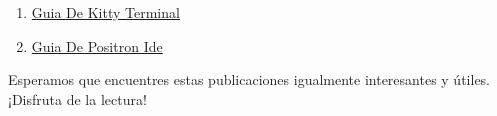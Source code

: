 \documentclass[
  jou,
  floatsintext,
  longtable,
  a4paper,
  nolmodern,
  notxfonts,
  notimes,
  12pt,
  colorlinks=true,linkcolor=blue,citecolor=blue,urlcolor=blue]{apa7}
\begin{document}
\begin{enumerate}
  \href{https://chaska-x.netlify.app/operating-system/2025-12-30-guia-de-ranger/index.pdf}{}
  \href{https://chaska-x.netlify.app/operating-system/2025-12-30-guia-de-ranger}{Guia
  De Ranger}
\item
  \href{https://chaska-x.netlify.app/operating-system/2025-12-31-guia-de-kitty-terminal/index.pdf}{}
  \href{https://chaska-x.netlify.app/operating-system/2025-12-31-guia-de-kitty-terminal}{Guia
  De Kitty Terminal}
\item
  \href{https://chaska-x.netlify.app/operating-system/2025-12-31-guia-de-positron-ide/index.pdf}{}
  \href{https://chaska-x.netlify.app/operating-system/2025-12-31-guia-de-positron-ide}{Guia
  De Positron Ide}
\end{enumerate}

Esperamos que encuentres estas publicaciones igualmente interesantes y
útiles. ¡Disfruta de la lectura!
\end{document}
